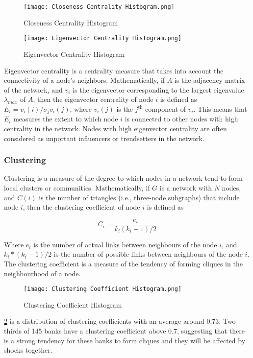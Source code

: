 \begin{figure}[H]
    \centering
    \begin{minipage}{0.49\textwidth}
    \centering
    \texttt{[image: Closeness Centrality Histogram.png]}
    \caption{Closeness Centrality Histogram}\label{fig:Closeness Centrality Histogram}
    \end{minipage}
    \centering
    \begin{minipage}{0.49\textwidth}
    \centering
    \texttt{[image: Eigenvector Centrality Histogram.png]}
    \caption{Eigenvector Centrality Histogram}\label{fig:Eigenvector Centrality Histogram}
    \end{minipage}
\end{figure}
Eigenvector centrality\cite{zaki2014data} is a centrality measure that takes into account the connectivity of a node's neighbors. Mathematically, if $A$ is the adjacency matrix of the network, and $v_i$ is the eigenvector corresponding to the largest eigenvalue $\lambda_{max}$ of $A$, then the eigenvector centrality of node $i$ is defined as $E_i = v_i(i)/\sigma_j v_i(j)$, where $v_i(j)$ is the $j^\text{th}$ component of $v_i$. This means that $E_i$ measures the extent to which node $i$ is connected to other nodes with high centrality in the network. Nodes with high eigenvector centrality are often considered as important influencers or trendsetters in the network.

\subsubsection{Clustering}
Clustering\cite{holland1971transitivity} is a measure of the degree to which nodes in a network tend to form local clusters or communities. Mathematically, if $G$ is a network with $N$ nodes, and $C(i)$ is the number of triangles (i.e., three-node subgraphs) that include node $i$, then the clustering coefficient of node $i$ is defined as

\[
    C_i = \frac{e_i}{k_i(k_i - 1)/2}
\]

Where $e_i$ is the number of actual links between neighbours of the node $i$, and $k_i*(k_i-1)/2$ is the number of possible links between neighbours of the node $i$. The clustering coefficient is a measure of the tendency of forming cliques in the neighbourhood of a node.

\begin{figure}[H]
    \centering
    \texttt{[image: Clustering Coefficient Histogram.png]}
    \caption{Clustering Coefficient Histogram}\label{fig:Clustering Coefficient Histogram}
\end{figure}
\ref*{fig:Clustering Coefficient Histogram} is a distribution of clustering coefficients with an average around 0.73. Two thirds of 145 banks have a clustering coefficient above 0.7, suggesting that there is a strong tendency for these banks to form cliques and they will be affected by shocks together.

